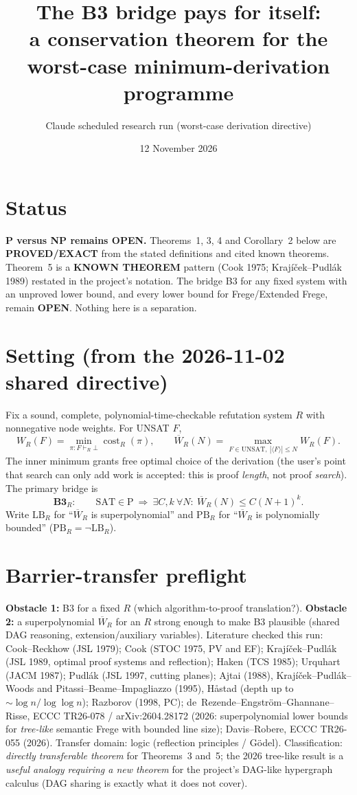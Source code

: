 \documentclass[11pt]{article}
\title{The B3 bridge pays for itself:\\
a conservation theorem for the worst-case minimum-derivation programme}
\author{Claude scheduled research run (worst-case derivation directive)}
\date{12 November 2026}
\theoremstyle{definition}
\newcommand{\Wbar}{\overline W}
\newcommand{\SAT}{\mathrm{SAT}}
\newcommand{\UNSAT}{\mathrm{UNSAT}}
\begin{document}
\maketitle

\section*{Status}
\textbf{P versus NP remains OPEN.} Theorems~1, 3, 4 and Corollary~2 below are
\textbf{PROVED/EXACT} from the stated definitions and cited known theorems.
Theorem~5 is a \textbf{KNOWN THEOREM} pattern (Cook 1975; Krajíček--Pudlák 1989)
restated in the project's notation. The bridge B3 for any fixed system with an
unproved lower bound, and every lower bound for Frege/Extended Frege, remain
\textbf{OPEN}. Nothing here is a separation.

\section{Setting (from the 2026-11-02 shared directive)}
Fix a sound, complete, polynomial-time-checkable refutation system $R$ with
nonnegative node weights. For UNSAT $F$,
\[
W_R(F)=\min_{\pi:F\vdash_R\bot}\operatorname{cost}_R(\pi),\qquad
\Wbar_R(N)=\max_{F\in\UNSAT,\ |\langle F\rangle|\le N} W_R(F).
\]
The inner minimum grants free optimal choice of the derivation (the user's
point that search can only add work is accepted: this is proof \emph{length},
not proof \emph{search}). The primary bridge is
\[
\textbf{B3}_R:\qquad \SAT\in \mathrm P\ \Longrightarrow\ \exists C,k\ \forall N:\ \Wbar_R(N)\le C(N+1)^k .
\]
Write $\mathrm{LB}_R$ for ``$\Wbar_R$ is superpolynomial'' and
$\mathrm{PB}_R$ for ``$\Wbar_R$ is polynomially bounded'' ($\mathrm{PB}_R=\neg\mathrm{LB}_R$).

\section{Barrier-transfer preflight}
\textbf{Obstacle 1:} B3 for a fixed $R$ (which algorithm-to-proof translation?).
\textbf{Obstacle 2:} a superpolynomial $\Wbar_R$ for an $R$ strong enough to
make B3 plausible (shared DAG reasoning, extension/auxiliary variables).
Literature checked this run: Cook--Reckhow (JSL 1979); Cook (STOC 1975, PV and
EF); Krajíček--Pudlák (JSL 1989, optimal proof systems and reflection);
Haken (TCS 1985); Urquhart (JACM 1987); Pudlák (JSL 1997, cutting planes);
Ajtai (1988), Krajíček--Pudlák--Woods and Pitassi--Beame--Impagliazzo (1995),
Håstad (depth up to $\sim\log n/\log\log n$); Razborov (1998, PC);
de~Rezende--Engström--Ghannane--Risse, ECCC TR26-078 / arXiv:2604.28172
(2026: superpolynomial lower bounds for \emph{tree-like} semantic Frege with
bounded line size); Davis--Robere, ECCC TR26-055 (2026).
Transfer domain: logic (reflection principles / Gödel). Classification:
\emph{directly transferable theorem} for Theorems~3 and~5; the 2026 tree-like
result is a \emph{useful analogy requiring a new theorem} for the project's
DAG-like hypergraph calculus (DAG sharing is exactly what it does not cover).
\end{document}
